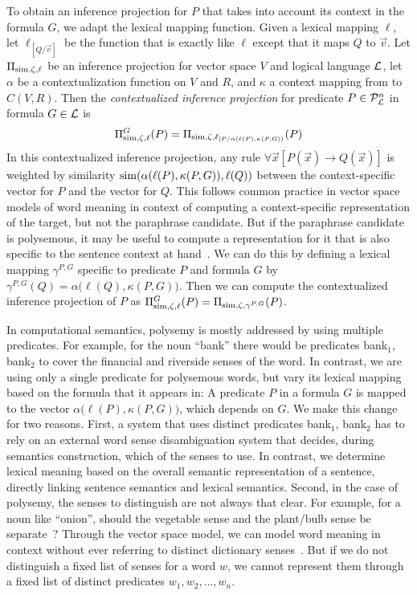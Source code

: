 To obtain an inference projection for $P$ that takes into account its
context in the formula $G$, we adapt the lexical mapping
function. Given a lexical mapping $\ell$, let $\ell_{[Q/\vec{v}]}$ be the
function that is exactly like $\ell$ except that it maps $Q$ to $\vec
v$. Let $\Pi_{\mathrm{sim}, \zeta, \ell}$ be an inference projection for
  vector space $V$ and logical language ${\cal{L}}$, let $\alpha$ be a contextualization function
on $V$ and $R$, and $\kappa$ a context mapping from \loglang to $C(V, R)$.
Then the \textit{contextualized inference projection} for predicate $P \in
{\cal{P}}_{{\cal{L}}}^n$ in formula $G \in {\cal{L}}$ is
\[
\Pi^G_{\mathrm{sim}, \zeta, \ell}(P) = \Pi_{\mathrm{sim}, \zeta,
  \ell_{[P/\alpha(\ell(P), \kappa(P, G))}}(P)
\]
In this contextualized inference projection, any rule $\forall \vec x
[P(\vec x) \to Q(\vec x)]$ is weighted by similarity
$\mathrm{sim}(\alpha(\ell(P), \kappa(P, G)), \ell(Q))$ between the
context-specific vector for $P$ and the vector for $Q$. This follows
common practice in vector space models of word meaning in context of
computing a context-specific representation of the target, but not the
paraphrase candidate. But if the paraphrase candidate is polysemous,
it may be useful to compute a representation for it that is also
specific to the sentence context at hand~\citep{erk:acl2010}.  We can
do this by defining a lexical mapping $\gamma^{P, G}$ specific to predicate $P$ and formula $G$ by $\gamma^{P, G}(Q) = \alpha\big(\ell(Q), \kappa(P, G)\big)$. Then we can
compute the contextualized inference projection of $P$ as
$\Pi^G_{\mathrm{sim}, \zeta, \ell}(P) = \Pi_{\mathrm{sim}, \zeta, \gamma^{P, G}}(P)$.

In computational semantics, polysemy is mostly addressed by using multiple
predicates. For example, for the noun ``bank'' there would be 
predicates
bank$_1$, bank$_2$ to cover the financial and riverside senses of the
word. In contrast, we are using only a single predicate for polysemous
words, but vary its lexical mapping based on the formula that it
appears in: A predicate $P$ in a formula $G$ is mapped to the vector
$\alpha\big(\ell(P), \kappa(P, G)\big)$, which depends on $G$. We make this change for two
reasons. First, a system that uses distinct predicates bank$_1$,
bank$_2$ has to rely on an external word sense
disambiguation system that decides, during semantics construction,
which of the senses to use. In contrast, we determine lexical meaning
based on the overall semantic representation of a sentence, directly
linking sentence semantics and lexical semantics. Second, in the case of polysemy, the senses to distinguish are
not always that clear. For example, for a noun like ``onion'', should
the vegetable sense and the plant/bulb sense be separate~\citep{KrishnamurthyNicholls:00}?
Through the vector space model, we can model
word meaning in context without ever referring to distinct dictionary
senses~\citep{Erk:2010}. But if we do not distinguish a fixed list of
senses for a word $w$, we cannot represent them through a fixed list of distinct
predicates $w_1, w_2, \ldots, w_n$.  
